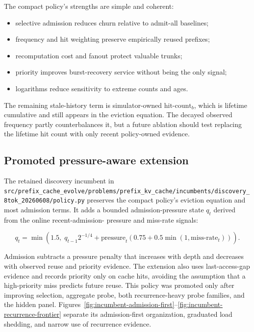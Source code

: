 \documentclass[11pt]{article}
\newcommand{\filepath}[1]{\nolinkurl{#1}}
\begin{document}
The compact policy's strengths are simple and coherent:

\begin{itemize}
  \item selective admission reduces churn relative to admit-all baselines;
  \item frequency and hit weighting preserve empirically reused prefixes;
  \item recomputation cost and fanout protect valuable trunks;
  \item priority improves burst-recovery service without being the only signal;
  \item logarithms reduce sensitivity to extreme counts and ages.
\end{itemize}

The remaining stale-history term is simulator-owned \(\text{hit-count}_b\), which is
lifetime cumulative and still appears in the eviction equation.  The decayed observed
frequency partly counterbalances it, but a future ablation should test replacing the
lifetime hit count with only recent policy-owned evidence.

\subsection{Promoted pressure-aware extension}

The retained discovery incumbent in
\filepath{src/prefix_cache_evolve/problems/prefix_kv_cache/incumbents/discovery_8tok_20260608/policy.py}
preserves the compact policy's eviction equation and most admission terms.  It adds a
bounded admission-pressure state \(q_t\) derived from the online recent-admission-
pressure and miss-rate signals:

\begin{equation}
  q_t = \min\left(1.5,\;q_{t-1}2^{-1/4}
  + \text{pressure}_t\left(0.75+0.5\min(1,\text{miss-rate}_t)\right)\right).
\end{equation}

Admission subtracts a pressure penalty that increases with depth and decreases with
observed reuse and priority evidence.  The extension also uses last-access-gap evidence
and records priority only on cache hits, avoiding the assumption that a high-priority
miss predicts future reuse.  This policy was promoted only after improving selection,
aggregate probe, both recurrence-heavy probe families, and the hidden panel.
Figures~\ref{fig:incumbent-admission-first}--\ref{fig:incumbent-recurrence-frontier}
separate its admission-first organization, graduated load shedding, and narrow use of
recurrence evidence.
\end{document}
